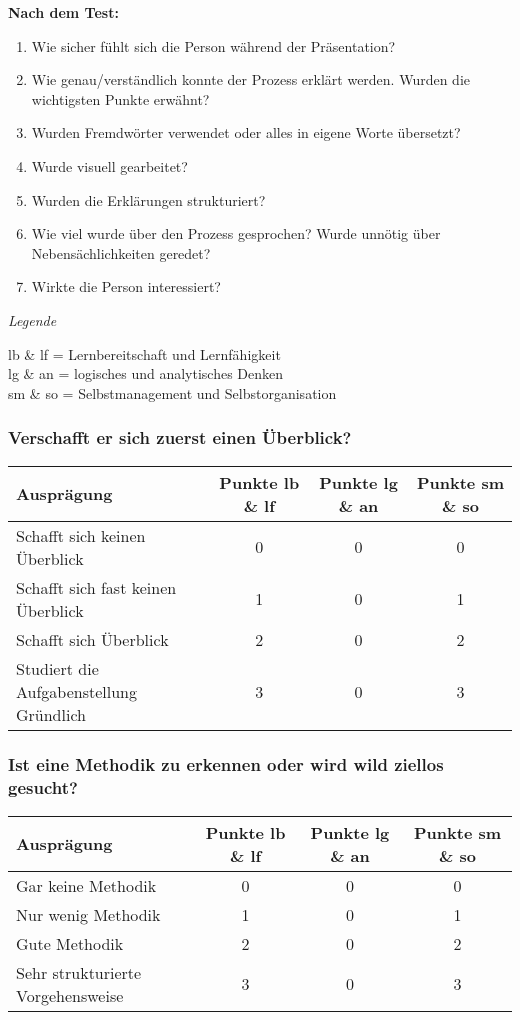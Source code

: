 \textbf{Nach dem Test:}
\begin{enumerate}
\item Wie sicher fühlt sich die Person während der Präsentation?
\item Wie genau/verständlich konnte der Prozess erklärt werden. Wurden die wichtigsten Punkte erwähnt?
\item Wurden Fremdwörter verwendet oder alles in eigene Worte übersetzt?
\item Wurde visuell gearbeitet?
\item Wurden die Erklärungen strukturiert?
\item Wie viel wurde über den Prozess gesprochen? Wurde unnötig über Nebensächlichkeiten geredet?
\item Wirkte die Person interessiert?
\end{enumerate}
\vspace{3mm}

\textit{Legende}

lb \& lf = Lernbereitschaft und Lernfähigkeit\\
lg \& an = logisches und analytisches Denken \\
sm \& so = Selbstmanagement und Selbstorganisation

\subsubsection{Verschafft er sich zuerst einen Überblick?}
\begin{tabular}{| l | c | c | c |}
  \hline	
  \textbf{Ausprägung} & \textbf{Punkte lb \& lf} & \textbf{Punkte lg \& an} & \textbf{Punkte sm \& so} \\
  \hline  		
  Schafft sich keinen Überblick & 0  & 0 & 0 \\ 
  \hline
  Schafft sich fast keinen Überblick & 1 & 0 & 1 \\ 
  \hline
  Schafft sich Überblick & 2 & 0 & 2 \\
  \hline  
  Studiert die Aufgabenstellung Gründlich & 3 & 0 &  3 \\
  \hline  
\end{tabular}
  
\subsubsection{Ist eine Methodik zu erkennen oder wird wild ziellos gesucht?}
\begin{tabular}{| l | c | c | c |}
  \hline	
  \textbf{Ausprägung} & \textbf{Punkte lb \& lf} & \textbf{Punkte lg \& an} & \textbf{Punkte sm \& so} \\
  \hline  		
  Gar keine Methodik & 0  & 0 & 0 \\ 
  \hline
  Nur wenig Methodik & 1 & 0 & 1 \\ 
  \hline
  Gute Methodik & 2 & 0 & 2 \\
  \hline  
  Sehr strukturierte Vorgehensweise & 3 & 0 &  3 \\
  \hline  
\end{tabular}

